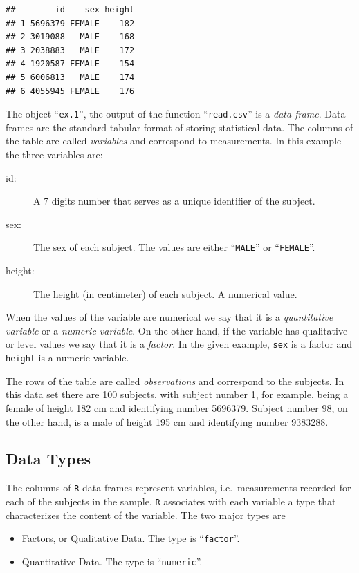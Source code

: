 \documentclass[]{krantz}
\theoremstyle{definition}
\theoremstyle{definition}
\theoremstyle{definition}
\theoremstyle{remark}
\begin{document}
\begin{verbatim}
##        id    sex height
## 1 5696379 FEMALE    182
## 2 3019088   MALE    168
## 3 2038883   MALE    172
## 4 1920587 FEMALE    154
## 5 6006813   MALE    174
## 6 4055945 FEMALE    176
\end{verbatim}

The object ``\texttt{ex.1}'', the output of the function ``\texttt{read.csv}'' is a \emph{data
frame}. Data frames are the standard tabular format of storing
statistical data. The columns of the table are called \emph{variables} and
correspond to measurements. In this example the three variables are:

\begin{description}
\item[id:]
A 7 digits number that serves as a unique identifier of the subject.
\item[sex:]
The sex of each subject. The values are either ``\texttt{MALE}'' or
``\texttt{FEMALE}''.
\item[height:]
The height (in centimeter) of each subject. A numerical value.
\end{description}

When the values of the variable are numerical we say that it is a
\emph{quantitative variable} or a \emph{numeric variable}. On the other hand, if
the variable has qualitative or level values we say that it is a
\emph{factor}. In the given example, \texttt{sex} is a factor and \texttt{height} is a
numeric variable.

The rows of the table are called \emph{observations} and correspond to the
subjects. In this data set there are 100 subjects, with subject number
1, for example, being a female of height 182 cm and identifying number
5696379. Subject number 98, on the other hand, is a male of height 195
cm and identifying number 9383288.

\hypertarget{data-types}{%
\subsection{Data Types}\label{data-types}}

The columns of \texttt{R} data frames represent variables, i.e.~measurements
recorded for each of the subjects in the sample. \texttt{R} associates with
each variable a type that characterizes the content of the variable. The
two major types are

\begin{itemize}
\item
  Factors, or Qualitative Data. The type is ``\texttt{factor}''.
\item
  Quantitative Data. The type is ``\texttt{numeric}''.
\end{itemize}
\end{document}
